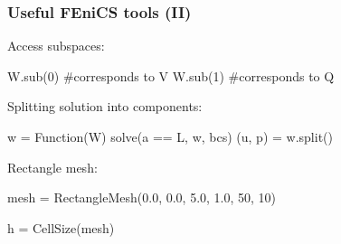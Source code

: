 \begin{frame}[fragile]
  \frametitle{Useful FEniCS tools (II)}
  Access subspaces:
  \vspace{-0.5cm}
  \begin{python}
W.sub(0) #corresponds to V
W.sub(1) #corresponds to Q
  \end{python}
 Splitting solution into components:
  \vspace{-0.5cm}
 \begin{python}
w = Function(W)
solve(a == L, w, bcs)
(u, p) = w.split()
 \end{python}
  Rectangle mesh:
 \vspace{-0.5cm}
  \begin{python}
mesh = RectangleMesh(0.0, 0.0, 5.0, 1.0, 50, 10)
  \end{python}
 \vspace{-0.5cm}
  \begin{python}
h = CellSize(mesh)
  \end{python}
\end{frame}
